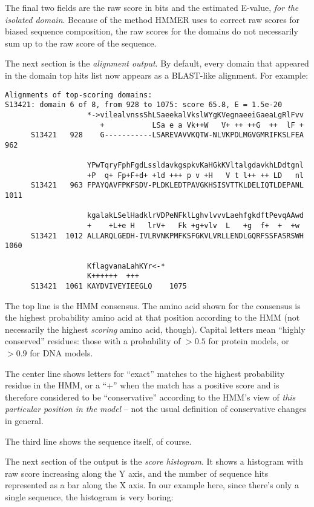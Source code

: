\documentclass[11pt]{report}
\begin{document}
The final two fields are the raw score in bits and the estimated
E-value, {\em for the isolated domain}. Because of the method HMMER
uses to correct raw scores for biased sequence composition, the raw
scores for the domains do not necessarily sum up to the raw score of
the sequence.

The next section is the {\em alignment output}. By default, every
domain that appeared in the domain top hits list now appears as a
BLAST-like alignment. For example:

{\small\begin{verbatim}
Alignments of top-scoring domains:
S13421: domain 6 of 8, from 928 to 1075: score 65.8, E = 1.5e-20
                   *->vilealvnssShLSaeekalVkslWYgKVegnaeeiGaeaLgRlFvv
                      +           LSa e a Vk++W   V+ ++ ++G  ++  lF +
      S13421   928    G-----------LSAREVAVVKQTW-NLVKPDLMGVGMRIFKSLFEA 962  

                   YPwTqryFphFgdLssldavkgspkvKaHGkKVltalgdavkhLDdtgnl
                   +P  q+ Fp+F+d+ +ld +++ p v +H   V t l++ ++ LD   nl
      S13421   963 FPAYQAVFPKFSDV-PLDKLEDTPAVGKHSISVTTKLDELIQTLDEPANL 1011 

                   kgalakLSelHadklrVDPeNFklLghvlvvvLaehfgkdftPevqAAwd
                   +    +L+e H   lrV+   Fk +g+vlv  L   +g  f+  +  +w 
      S13421  1012 ALLARQLGEDH-IVLRVNKPMFKSFGKVLVRLLENDLGQRFSSFASRSWH 1060 

                   KflagvanaLahKYr<-*
                   K++++++  +++      
      S13421  1061 KAYDVIVEYIEEGLQ    1075 
\end{verbatim}}

The top line is the HMM consensus. The amino acid shown for the
consensus is the highest probability amino acid at that position
according to the HMM (not necessarily the highest {\em scoring} amino
acid, though). Capital letters mean ``highly conserved'' residues:
those with a probability of $> 0.5$ for protein models, or $> 0.9$ for
DNA models. 

The center line shows letters for ``exact'' matches to the highest
probability residue in the HMM, or a ``+'' when the match has a
positive score and is therefore considered to be ``conservative''
according to the HMM's view of {\em this particular position in the
model} -- not the usual definition of conservative changes in general.

The third line shows the sequence itself, of course.

The next section of the output is the {\em score histogram}.  It shows
a histogram with raw score increasing along the Y axis, and the number
of sequence hits represented as a bar along the X axis. In our example
here, since there's only a single sequence, the histogram is very
boring:
\end{document}
